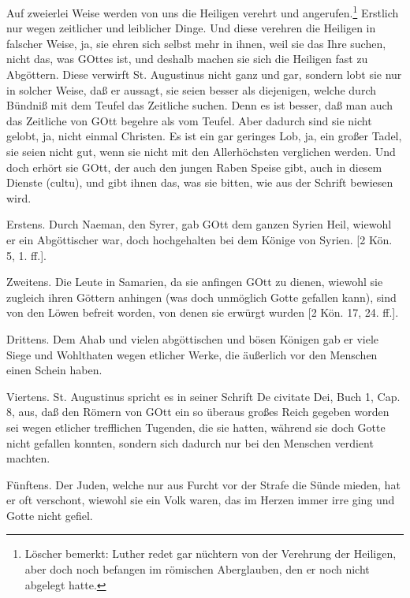 Auf zweierlei Weise werden von uns die Heiligen verehrt und angerufen.\footnote{Löscher bemerkt: Luther redet gar nüchtern von der Verehrung der Heiligen, aber doch noch befangen im römischen Aberglauben, den er noch nicht abgelegt hatte.} Erstlich nur wegen zeitlicher und leiblicher Dinge. Und diese verehren die Heiligen in falscher Weise, ja, sie ehren sich selbst mehr in ihnen, weil sie das Ihre suchen, nicht das, was GOttes ist, und deshalb machen sie sich die Heiligen fast zu Abgöttern. Diese verwirft St. Augustinus nicht ganz und gar, sondern lobt sie nur in solcher Weise, daß er aussagt, sie seien besser als diejenigen, welche durch Bündniß mit dem Teufel das Zeitliche suchen. Denn es ist besser, daß man auch das Zeitliche von GOtt begehre als vom Teufel. Aber dadurch sind sie nicht gelobt, ja, nicht einmal Christen. Es ist ein gar geringes Lob, ja, ein großer Tadel, sie seien nicht gut, wenn sie nicht mit den Allerhöchsten verglichen werden. Und doch erhört sie GOtt, der auch den jungen Raben Speise gibt, auch in diesem Dienste (cultu), und gibt ihnen das, was sie bitten, wie aus der Schrift bewiesen wird.

Erstens. Durch Naeman, den Syrer, gab GOtt dem ganzen Syrien Heil, wiewohl er ein Abgöttischer war, doch hochgehalten bei dem Könige von Syrien. [2 Kön. 5, 1. ff.].

Zweitens. Die Leute in Samarien, da sie anfingen GOtt zu dienen, wiewohl sie zugleich ihren Göttern anhingen (was doch unmöglich Gotte gefallen kann), sind von den Löwen befreit worden, von denen sie erwürgt wurden [2 Kön. 17, 24. ff.].

Drittens. Dem Ahab und vielen abgöttischen und bösen Königen gab er viele Siege und Wohlthaten wegen etlicher Werke, die äußerlich vor den Menschen einen Schein haben.

Viertens. St. Augustinus spricht es in seiner Schrift De civitate Dei, Buch 1, Cap. 8, aus, daß den Römern von GOtt ein so überaus großes Reich gegeben worden sei wegen etlicher trefflichen Tugenden, die sie hatten, während sie doch Gotte nicht gefallen konnten, sondern sich dadurch nur bei den Menschen verdient machten.

Fünftens. Der Juden, welche nur aus Furcht vor der Strafe die Sünde mieden, hat er oft verschont, wiewohl sie ein Volk waren, das im Herzen immer irre ging und Gotte nicht gefiel.

